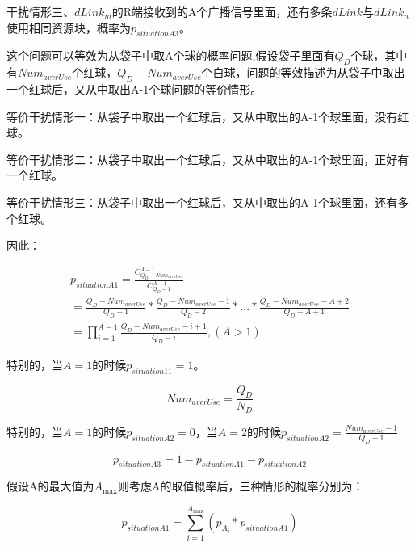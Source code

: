 \documentclass[figurelist,tablelist,algorithmlist,nomlist,masters]{seuthesix}
\begin{document}
	干扰情形三、$dLink_m$的R端接收到的A个广播信号里面，还有多条$dLink$与$dLink_n$使用相同资源块，概率为${p_{situationA3}}$。
	
	这个问题可以等效为从袋子中取A个球的概率问题,假设袋子里面有$Q_D$个球，其中有$Nu{m_{averUse}}$个红球，$Q_D - Nu{m_{averUse}}$个白球，问题的等效描述为从袋子中取出一个红球后，又从中取出A-1个球问题的等价情形。
	
	等价干扰情形一：从袋子中取出一个红球后，又从中取出的A-1个球里面，没有红球。
	
	等价干扰情形二：从袋子中取出一个红球后，又从中取出的A-1个球里面，正好有一个红球。
	
	等价干扰情形三：从袋子中取出一个红球后，又从中取出的A-1个球里面，还有多个红球。
	
	因此：
	
	\begin{equation}\label{eq3.1}
	\begin{array}{c}
	{p_{situationA1}} = \frac{{C_{Q_D - Nu{m_{averUse}}}^{A - 1}}}{{C_{Q_D - 1}^{A - 1}}}\\
	= \frac{{Q_D - Nu{m_{averUse}}}}{{Q_D - 1}}*\frac{{Q_D - Nu{m_{averUse}} - 1}}{{Q_D - 2}}*...*\frac{{Q_D - Nu{m_{averUse}} - A + 2}}{{Q_D - A + 1}}\\
	= \prod\limits_{i = 1}^{A - 1} {\frac{{Q_D - Nu{m_{averUse}} - i + {1}}}{{Q_D - i}},(A > 1)} 
	\end{array}
	\end{equation}
	
	特别的，当${A = 1}$的时候${p_{situation11} = 1}$。

	\begin{equation}\label{eq3.1}
	Nu{m_{averUse}} = \frac{{Q_D}}{{N_D}}
	\end{equation}
	
	特别的，当${A=1}$的时候${p_{situationA2}} = 0$，当$A=2$的时候${p_{situationA2}} = \frac{{Nu{m_{averUse}} - 1}}{{Q_D - 1}}$
	
	\begin{equation}\label{eq3.1}
	{p_{situationA3}} = 1 - {p_{situationA1}} - {p_{situationA{2}}}
	\end{equation}
	
	假设A的最大值为${A_{\max }}$则考虑A的取值概率后，三种情形的概率分别为：
	
	\begin{equation}\label{eq3.1}
	{p_{situation\overline A 1}} = \sum\limits_{i = 1}^{{A_{\max }}} {({p_{{A_i}}}*{p_{situationA1}})}
	\end{equation}
	
\end{document}
